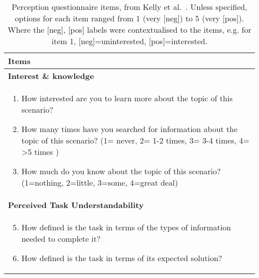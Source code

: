 \documentclass[sigconf]{acmart}
\begin{document}

%
\maketitle
%
%
%
%
%
%
%





 

\appendix
\begin{table}[tb]
	\centering
	\small
	\caption{Perception questionnaire items, from Kelly et al.~\citep{Kelly2015}. Unless specified, options for each item ranged from 1 (very [neg]) to 5 (very [pos]). Where the [neg], [pos] labels were contextualised to the items, e.g. for item 1, [neg]=uninterested, [pos]=interested.} \label{table: pre questionnaire}
	\vspace{-10px}
	\begin{tabular}{p{8cm}}
		\toprule
		\textbf{Items}  \\
		\toprule
		
		\textbf{Interest \& knowledge} \\
		\begin{enumerate}[leftmargin=*,  topsep=0pt, labelsep=1pt]
			\item How interested are you to learn more about the topic of this scenario?
			\item How many times have you searched for information about the topic of this scenario? (1= never, 2= 1-2 times, 3= 3-4 times, 4= >5 times )
			\item How much do you know about the topic of this scenario? (1=nothing, 2=little, 3=some, 4=great deal)
		\end{enumerate} \\
		
		\toprule
		\textbf{Perceived Task Understandability} \\
		\begin{enumerate}[leftmargin=*,  topsep=0pt, labelsep=1pt]
			\setcounter{enumi}{4}
			\item How defined is the task in terms of the types of information needed to complete it?
			\item How defined is the task in terms of its expected solution?
		\end{enumerate} \\
		\bottomrule
	\end{tabular} 
\end{table}
\end{document}
